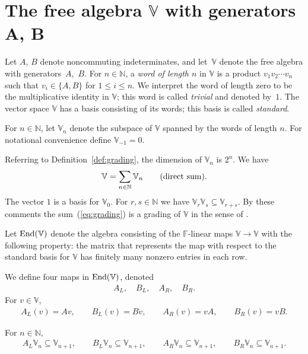 \section[The free algebra $\mathbb V$ with generators $A$, $B$]{The free algebra $\boldsymbol{\mathbb V}$ with generators $\boldsymbol{A}$, $\boldsymbol{B}$}\label{section3}

Let $A$, $B$ denote noncommuting indeterminates, and let~$\mathbb V$ denote the free algebra
with genera\-tors~$A$,~$B$. For $n \in \mathbb N$, a {\it word of length $n$} in $\mathbb V$
is a product $v_1 v_2 \cdots v_n$ such that $v_i \in \lbrace A, B\rbrace$
for $1 \leq i \leq n$. We interpret the word of length zero
 to be the multiplicative identity in $\mathbb V$; this word is called {\it trivial} and denoted by~$1$.
The vector space $\mathbb V$ has a basis consisting of its words; this basis is called {\it standard}.

\begin{Definition}\label{def:grading}For $n \in \mathbb N$, let ${\mathbb V}_n$ denote the
subspace of $\mathbb V$ spanned by the words of length $n$. For notational convenience define ${\mathbb V}_{-1}=0$.
\end{Definition}

Referring to Definition~\ref{def:grading}, the dimension of ${\mathbb V}_n$ is $2^n$. We have
\begin{gather}\label{eq:grading}
\mathbb V=\sum_{n \in \mathbb N} {\mathbb V}_n \qquad \mbox{\rm (direct sum).}
\end{gather}
The vector $1$ is a basis for ${\mathbb V}_0$.
For $r,s\in \mathbb N$ we have ${\mathbb V}_r {\mathbb V}_s \subseteq
{\mathbb V}_{r+s}$.
By these comments
the sum~(\ref{eq:grading}) is a grading of $\mathbb V$ in the sense of
\cite[p.~704]{rotman}.

Let ${\rm End}(\mathbb V)$ denote the algebra consisting of the
$\mathbb F$-linear maps $\mathbb V \to \mathbb V$
with the following property: the matrix that represents the map
with respect to the standard basis for $\mathbb V$ has
 finitely many nonzero entries in each row.

\begin{Definition}\label{def:ALetc}
We define four maps in ${\rm End}(\mathbb V)$, denoted
\begin{gather}
A_L, \quad
B_L, \quad
A_R, \quad
B_R.
\label{eq:leftmult}
\end{gather}
For $v \in \mathbb V$,
\begin{gather*}
A_L(v)=Av, \qquad
B_L(v)=Bv, \qquad
A_R(v)=vA, \qquad
B_R(v)=vB.%
\end{gather*}
\end{Definition}
\begin{Lemma}\label{lem:ABraise}
For $n \in \mathbb N$,
\begin{gather*}
A_L {\mathbb V}_n \subseteq {\mathbb V}_{n+1}, \qquad
B_L {\mathbb V}_n \subseteq {\mathbb V}_{n+1}, \qquad
A_R {\mathbb V}_n \subseteq {\mathbb V}_{n+1}, \qquad
B_R {\mathbb V}_n \subseteq {\mathbb V}_{n+1}.
\end{gather*}
\end{Lemma}

